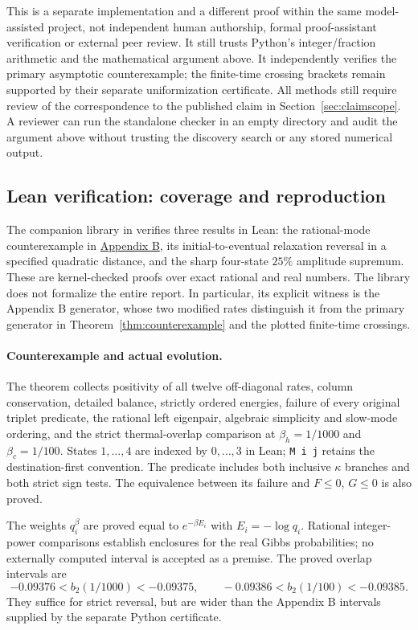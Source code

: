\documentclass[11pt]{article}
\begin{document}
This is a separate implementation and a different proof within the same model-assisted project, not independent human authorship, formal proof-assistant verification or external peer review. It still trusts Python's integer/fraction arithmetic and the mathematical argument above. It independently verifies the primary asymptotic counterexample; the finite-time crossing brackets remain supported by their separate uniformization certificate. All methods still require review of the correspondence to the published claim in Section~\ref{sec:claimscope}. A reviewer can run the standalone checker in an empty directory and audit the argument above without trusting the discovery search or any stored numerical output.

\subsection{Lean verification: coverage and reproduction}\label{sec:lean}
The companion library in  verifies three results in Lean: the
rational-mode counterexample in \hyperref[app:rational]{Appendix B}, its
initial-to-eventual relaxation reversal in a specified quadratic distance,
and the sharp four-state $25\%$ amplitude supremum. These are kernel-checked
proofs over exact rational and real numbers. The library does not formalize
the entire report. In particular, its explicit witness is the Appendix B
generator, whose two modified rates distinguish it from the primary generator
in Theorem~\ref{thm:counterexample} and the plotted finite-time crossings.

\paragraph{Counterexample and actual evolution.}
The theorem  collects positivity of all
twelve off-diagonal rates, column conservation, detailed balance, strictly
ordered energies, failure of every original triplet predicate, the rational
left eigenpair, algebraic simplicity and slow-mode ordering, and the strict
thermal-overlap comparison at $\beta_h=1/1000$ and $\beta_c=1/100$.
States $1,\ldots,4$ are indexed by $0,\ldots,3$ in Lean; \texttt{M i j}
retains the destination-first convention. The predicate includes both
inclusive $\kappa$ branches and both strict sign tests. The equivalence
between its failure and $F\leq0$, $G\leq0$ is also proved.

The weights $q_i^\beta$ are proved equal to $e^{-\beta E_i}$ with
$E_i=-\log q_i$. Rational integer-power comparisons establish enclosures
for the real Gibbs probabilities; no externally computed interval is
accepted as a premise. The proved overlap intervals are
\[
 -0.09376<b_2(1/1000)<-0.09375,\qquad
 -0.09386<b_2(1/100)<-0.09385.
\]
They suffice for strict reversal, but are wider than the Appendix B
intervals supplied by the separate Python certificate.
\end{document}
